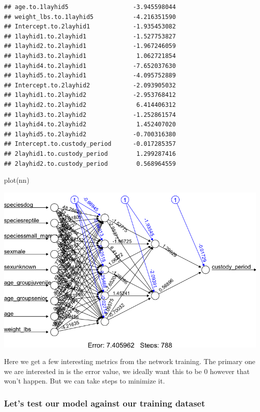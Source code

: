 \documentclass[
]{article}
\newenvironment{Shaded}{\begin{snugshade}}{\end{snugshade}}
\newcommand{\FunctionTok}[1]{\textcolor[rgb]{0.00,0.00,0.00}{#1}}
\newcommand{\NormalTok}[1]{#1}
\begin{document}
\begin{verbatim}
## age.to.1layhid5                  -3.945598044
## weight_lbs.to.1layhid5           -4.216351590
## Intercept.to.2layhid1            -1.935453082
## 1layhid1.to.2layhid1             -1.527753827
## 1layhid2.to.2layhid1             -1.967246059
## 1layhid3.to.2layhid1              1.062721854
## 1layhid4.to.2layhid1             -7.652037630
## 1layhid5.to.2layhid1             -4.095752889
## Intercept.to.2layhid2            -2.093905032
## 1layhid1.to.2layhid2             -2.953768412
## 1layhid2.to.2layhid2              6.414406312
## 1layhid3.to.2layhid2             -1.252861574
## 1layhid4.to.2layhid2              1.452407020
## 1layhid5.to.2layhid2             -0.700316380
## Intercept.to.custody_period      -0.017285357
## 2layhid1.to.custody_period        1.299287416
## 2layhid2.to.custody_period        0.568964559
\end{verbatim}

\begin{Shaded}
\begin{Highlighting}[]
\FunctionTok{plot}\NormalTok{(nn)}
\end{Highlighting}
\end{Shaded}

\includegraphics{media/NHSEnet1.png}

Here we get a few interesting metrics from the network training. The
primary one we are interested in is the error value, we ideally want
this to be 0 however that won't happen. But we can take steps to
minimize it.

\hypertarget{lets-test-our-model-against-our-training-dataset}{%
\subsubsection{Let's test our model against our training
dataset}\label{lets-test-our-model-against-our-training-dataset}}
\end{document}
